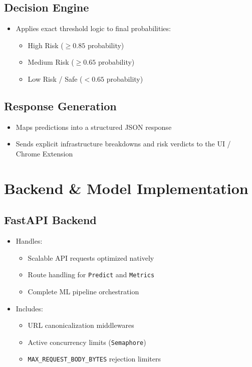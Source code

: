\subsection{Decision Engine}

\begin{itemize}
    \item Applies exact threshold logic to final probabilities:
    \begin{itemize}
        \item High Risk ($\geq 0.85$ probability)
        \item Medium Risk ($\geq 0.65$ probability)
        \item Low Risk / Safe ($< 0.65$ probability)
    \end{itemize}
\end{itemize}

\subsection{Response Generation}

\begin{itemize}
    \item Maps predictions into a structured JSON response
    \item Sends explicit infrastructure breakdowns and risk verdicts to the UI / Chrome Extension
\end{itemize}

\section{Backend \& Model Implementation}

\subsection{FastAPI Backend}

\begin{itemize}
    \item Handles:
    \begin{itemize}
        \item Scalable API requests optimized natively
        \item Route handling for \texttt{Predict} and \texttt{Metrics}
        \item Complete ML pipeline orchestration
    \end{itemize}
    \item Includes:
    \begin{itemize}
        \item URL canonicalization middlewares
        \item Active concurrency limits (\texttt{Semaphore})
        \item \texttt{MAX\_REQUEST\_BODY\_BYTES} rejection limiters
    \end{itemize}
\end{itemize}

